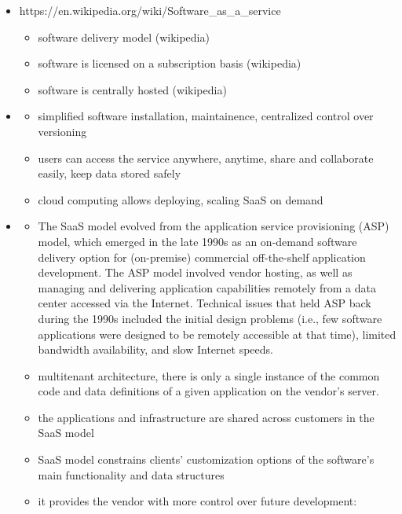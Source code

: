 \begin{itemize}
	\item https://en.wikipedia.org/wiki/Software\_as\_a\_service
	\begin{itemize}
		\item software delivery model (wikipedia)
		\item software is licensed on a subscription basis (wikipedia)
		\item software is centrally hosted (wikipedia)
	\end{itemize}
	\item \cite{AboveTheClouds}
	\begin{itemize}
		\item simplified software installation, maintainence, centralized control over versioning
		\item users can access the service anywhere, anytime, share and collaborate easily, keep data stored safely
		\item cloud computing allows deploying, scaling SaaS on demand
	\end{itemize}
	\item \cite{SaaSOppRisk}
	\begin{itemize}
		\item The SaaS model evolved from the application service provisioning (ASP) model, which emerged in the late 1990s as an on-demand software delivery option for (on-premise) commercial off-the-shelf application development. The ASP model involved vendor hosting, as well as managing and delivering application capabilities remotely from a data center accessed via the Internet. Technical issues that held ASP back during the 1990s included the initial design problems (i.e., few software applications were designed to be remotely accessible at that time), limited bandwidth availability, and slow Internet speeds. 
		\item multitenant architecture, there is only a single instance of the common code and data definitions of a given application on the vendor's server.
		\item the applications and infrastructure are shared across customers in the SaaS model
		\item SaaS model constrains clients' customization options of the software's main functionality and data structures
		\item it provides the vendor with more control over future development: 
	\end{itemize}
	
\end{itemize}


